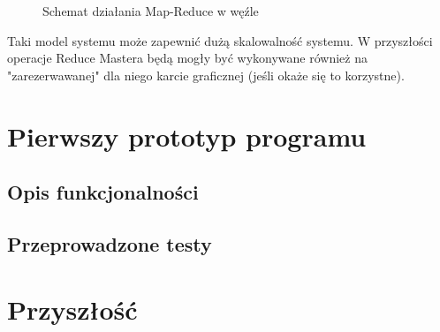 \documentclass[paper=a4, fontsize=11pt]{scrartcl} %
\numberwithin{equation}{section} %
\numberwithin{figure}{section} %
\numberwithin{table}{section} %
\begin{document}
\begin{itemize}
		\begin{figure}[t]
			\begin{center}
				\caption{Schemat działania Map-Reduce w węźle}
			\end{center}
		\end{figure}
\end{itemize}
\clearpage

Taki model systemu może zapewnić dużą skalowalność systemu. W przyszłości operacje Reduce Mastera będą mogły być wykonywane również na "zarezerwawanej" dla niego karcie graficznej (jeśli okaże się to korzystne).

\section{Pierwszy prototyp programu}
	\subsection{Opis funkcjonalności}
	\subsection{Przeprowadzone testy}

\section{Przyszłość}
\end{document}

